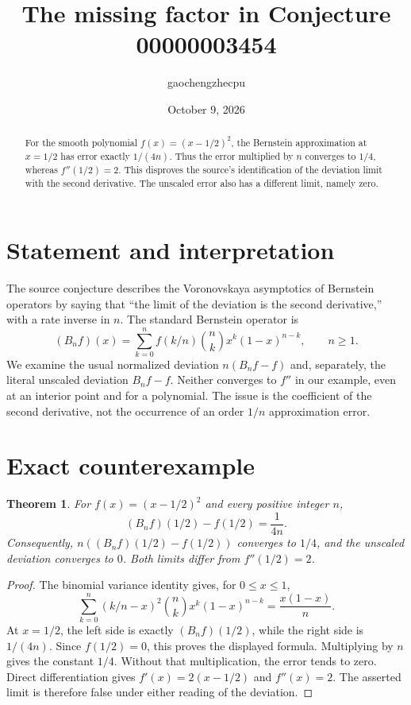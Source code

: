 \documentclass[11pt]{article}
\title{The missing factor in Conjecture 00000003454}
\author{gaochengzhecpu}
\date{October 9, 2026}
\newtheorem{theorem}{Theorem}
\begin{document}
\maketitle
\begin{abstract}
For the smooth polynomial $f(x)=(x-1/2)^2$, the Bernstein approximation
at $x=1/2$ has error exactly $1/(4n)$. Thus the error multiplied by $n$
converges to $1/4$, whereas $f''(1/2)=2$. This disproves the source's
identification of the deviation limit with the second derivative.
The unscaled error also has a different limit, namely zero.
\end{abstract}

\section{Statement and interpretation}
The source conjecture describes the Voronovskaya asymptotics of Bernstein
operators by saying that ``the limit of the deviation is the second
derivative,'' with a rate inverse in $n$. The standard Bernstein operator is
\[
 (B_nf)(x)=\sum_{k=0}^{n}f(k/n)\binom nk x^k(1-x)^{n-k},\qquad n\geq1.
\]
We examine the usual normalized deviation $n(B_nf-f)$ and, separately,
the literal unscaled deviation $B_nf-f$. Neither converges to $f''$ in
our example, even at an interior point and for a polynomial.
The issue is the coefficient of the second derivative, not the occurrence
of an order $1/n$ approximation error.

\section{Exact counterexample}
\begin{theorem}
For $f(x)=(x-1/2)^2$ and every positive integer $n$,
\[
 (B_nf)(1/2)-f(1/2)=\frac{1}{4n}.
\]
Consequently, $n((B_nf)(1/2)-f(1/2))$ converges to $1/4$, and the
unscaled deviation converges to $0$. Both limits differ from $f''(1/2)=2$.
\end{theorem}
\begin{proof}
The binomial variance identity gives, for $0\leq x\leq1$,
\[
 \sum_{k=0}^{n}(k/n-x)^2\binom nk x^k(1-x)^{n-k}
   =\frac{x(1-x)}n.
\]
At $x=1/2$, the left side is exactly $(B_nf)(1/2)$, while the right side
is $1/(4n)$. Since $f(1/2)=0$, this proves the displayed formula.
Multiplying by $n$ gives the constant $1/4$. Without that multiplication,
the error tends to zero. Direct differentiation gives
$f'(x)=2(x-1/2)$ and $f''(x)=2$. The asserted limit is therefore false
under either reading of the deviation.
\end{proof}
\end{document}
